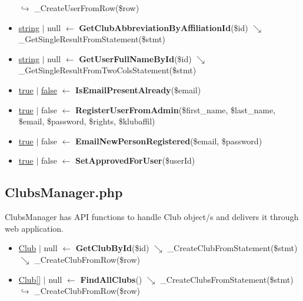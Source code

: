 \begin{itemize}
  \newline    $\hookrightarrow$ \_CreateUserFromRow(\$row)
  \item \underline{string} $\vert$ null $\leftarrow$ \textbf{GetClubAbbreviationByAffiliationId}(\$id)
  \newline    $\searrow$ \_GetSingleResultFromStatement(\$stmt)
  \item \underline{string} $\vert$ null $\leftarrow$ \textbf{GetUserFullNameById}(\$id)
  \newline    $\searrow$ \_GetSingleResultFromTwoColsStatement(\$stmt)
  \item \underline{true} $\vert$ \underline{false} $\leftarrow$ \textbf{IsEmailPresentAlready}(\$email)
  \item \underline{true} $\vert$ false $\leftarrow$ \textbf{RegisterUserFromAdmin}(\$first\_name, \$last\_name,
  \newline    \$email, \$password, \$rights, \$klubaffil)
  \item \underline{true} $\vert$ false $\leftarrow$ \textbf{EmailNewPersonRegistered}(\$email,
  \newline    \$password)
  \item \underline{true} $\vert$ false $\leftarrow$ \textbf{SetApprovedForUser}(\$userId)
\end{itemize}

\subsection{ClubsManager.php}
ClubsManager has API functions to handle Club object/s and delivers it through web application.
\begin{itemize}
  \setlength\itemsep{0em}
  \item \underline{Club} $\vert$ null $\leftarrow$ \textbf{GetClubById}(\$id)
  \newline    $\searrow$ \_CreateClubFromStatement(\$stmt)
  \newline    $\searrow$ \_CreateClubFromRow(\$row)
  \item \underline{Club[]} $\vert$ null $\leftarrow$ \textbf{FindAllClubs}()
  \newline    $\searrow$ \_CreateClubsFromStatement(\$stmt)
  \newline    $\hookrightarrow$ \_CreateClubFromRow(\$row)
\end{itemize}

